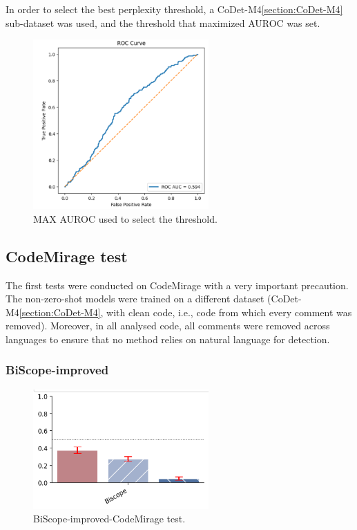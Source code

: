 In order to select the best perplexity threshold, 
a CoDet-M4\ref{section:CoDet-M4} sub-dataset was used, and the threshold that 
maximized AUROC was set.


\begin{figure}[H]
    \centering
    \includegraphics[width=0.6\textwidth]{img/LLMPPL/AUC.png}
    \caption{MAX AUROC used to select the threshold.}
    \label{fig:AUROC used to select the threshold.}
\end{figure}












\subsection{CodeMirage test}
The first tests were conducted on CodeMirage with a very important 
precaution. The non-zero-shot models were trained on a different dataset 
(CoDet-M4\ref{section:CoDet-M4}, with clean code, i.e., code from which every 
comment was removed). Moreover, in all analysed code, all comments were 
removed across languages to ensure that no method relies on natural 
language for detection.

\subsubsection{BiScope-improved}
\begin{figure}[H]
    \centering
    \includegraphics[width=0.6\textwidth]{img/BiScope/Codemirage.png}
    \caption{BiScope-improved-CodeMirage test.}
    \label{fig:BiScope-improved-CodeMirage test}
\end{figure}

